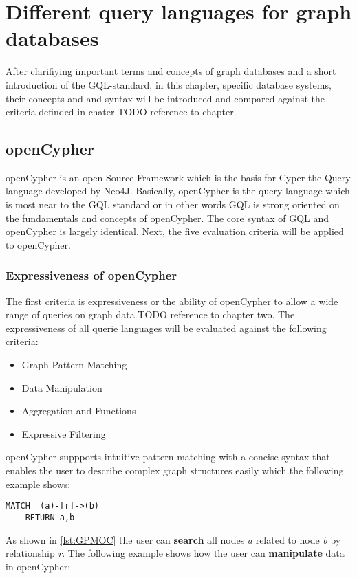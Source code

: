 \chapter{Different query languages for graph databases}
After clarifiying important terms and concepts of graph databases and a short introduction of the GQL-standard,
in this chapter, specific database systems, their concepts and and syntax will be introduced
and compared against the criteria definded in chater TODO reference to chapter.
\section{openCypher}
openCypher is an open Source Framework which is the basis for Cyper the Query language
developed by Neo4J.
Basically, openCypher is the query language which is most near to the GQL standard
or in other words GQL is strong oriented on the fundamentals and concepts of openCypher.
The core syntax of GQL and openCypher is largely identical.
Next, the five evaluation criteria will be applied to openCypher.
\subsection{Expressiveness of openCypher}
The first criteria is expressiveness or the ability of openCypher to allow a wide
range of queries on graph data TODO reference to chapter two. The expressiveness
of all querie languages will be evaluated against the following criteria:

\begin{itemize}
	\item Graph Pattern Matching
	\item Data Manipulation
	\item Aggregation and Functions
	\item Expressive Filtering
\end{itemize}
openCypher suppports intuitive pattern matching with a concise syntax that enables the
user to describe complex graph structures easily which the following example shows:
\begin{lstlisting}[caption={Graph Pattern Matching in openCypher}, label={lst:GPMOC}] 
	MATCH  (a)-[r]->(b)
	RETURN a,b
\end{lstlisting} As shown in \cref{lst:GPMOC} the user can \textbf{search} all nodes \textit{a}
related to node \textit{b} by relationship \textit{r}.\newline 
The following example shows how the user can \textbf{manipulate} data in openCypher:

